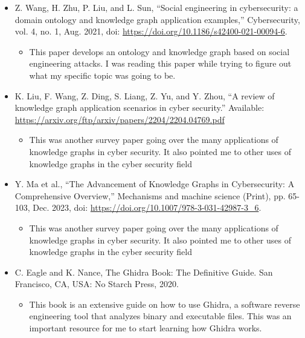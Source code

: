 \documentclass[12pt, a4paper]{article}
\begin{document}
    \begin{itemize}
        \item Z. Wang, H. Zhu, P. Liu, and L. Sun, “Social engineering in cybersecurity: a domain ontology and knowledge graph application examples,” 
        Cybersecurity, vol. 4, no. 1, Aug. 2021, doi: \url{https://doi.org/10.1186/s42400-021-00094-6}.
        \begin{itemize}
            \item This paper develops an ontology and knowledge graph based on social engineering attacks. 
            I was reading this paper while trying to figure out what my specific topic was going to be.
        \end{itemize}
    \end{itemize}
    \begin{itemize}
        \item K. Liu, F. Wang, Z. Ding, S. Liang, Z. Yu, and Y. Zhou, “A review of knowledge graph application scenarios in cyber security.” 
        Available: \url{https://arxiv.org/ftp/arxiv/papers/2204/2204.04769.pdf} 
        \begin{itemize}
            \item This was another survey paper going over the many applications of knowledge graphs in cyber security. 
            It also pointed me to other uses of knowledge graphs in the cyber security field
        \end{itemize}
    \end{itemize}
    \begin{itemize}
        \item Y. Ma et al., “The Advancement of Knowledge Graphs in Cybersecurity: A Comprehensive Overview,” Mechanisms and machine science (Print), 
        pp. 65-103, Dec. 2023, doi: \url{https://doi.org/10.1007/978-3-031-42987-3\_6}. 
        \begin{itemize}
            \item This was another survey paper going over the many applications of knowledge graphs in cyber security. 
            It also pointed me to other uses of knowledge graphs in the cyber security field
        \end{itemize}
    \end{itemize}
    \begin{itemize}
        \item C. Eagle and K. Nance, The Ghidra Book: The Definitive Guide. San Francisco, CA, USA: No Starch Press, 2020.
        \begin{itemize}
            \item This book is an extensive guide on how to use Ghidra, a software reverse engineering tool that analyzes binary and executable files. 
            This was an important resource for me to start learning how Ghidra works. 
        \end{itemize}
    \end{itemize}
\end{document}
